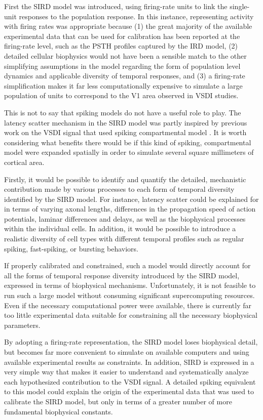 \documentclass[phd,ianc,twoside]{infthesis}
\begin{document}
First the SIRD model was introduced, using firing-rate units to link the
single-unit responses to the population response. In this instance,
representing activity with firing rates was appropriate because (1)
the great majority of the available experimental data that can be used
for calibration has been reported at the firing-rate level, such as
the PSTH profiles captured by the
IRD model, (2) detailed cellular biophysics would not have been a
sensible match to the other simplifying assumptions in the model
regarding the form of population level dynamics and applicable diversity
of temporal responses, and (3) a firing-rate simplification makes it far
less computationally expensive to simulate a large population of units
to correspond to the V1 area observed in VSDI studies.

This is not to say that spiking models do not have a useful
role to play. The latency scatter mechanism in the SIRD model was partly
inspired by previous work on the VSDI signal that used spiking
compartmental model \citep{chemla_neuroimage10}. It is worth considering
what benefits there would be if this kind of spiking, compartmental
model were expanded spatially in order to simulate several square
millimeters of cortical area.

Firstly, it would be possible to identify and quantify the detailed,
mechanistic contribution made by various processes to each form of
temporal diversity identified by the SIRD model. For instance, latency
scatter could be explained for in terms of varying axonal lengths,
differences in the propagation speed of action potentials, laminar
differences and delays, as well as the biophysical processes within the
individual cells. In addition, it would be possible to introduce a
realistic diversity of cell types with different temporal profiles such
as regular spiking, fast-spiking, or bursting behaviors.

If properly calibrated and constrained, such a model would directly
account for all the forms of temporal response diversity introduced by
the SIRD model, expressed in terms of biophysical
mechanisms. Unfortunately, it is not feasible to run such a large model
without consuming significant supercomputing resources. Even if the
necessary computational power were available, there is currently
far too little experimental data suitable for constraining all the
necessary biophysical parameters.

By adopting a firing-rate representation, the SIRD model loses
biophysical detail, but becomes far more convenient to simulate on
available computers and using available experimental results as constraints. 
In addition, SIRD is expressed in a very simple way that makes it
easier to understand and systematically analyze each hypothesized contribution to the
VSDI signal. A detailed spiking equivalent to this model could explain
the origin of the experimental data that was used to calibrate the SIRD
model, but only in terms of a greater number of more fundamental biophysical constants.
\end{document}
